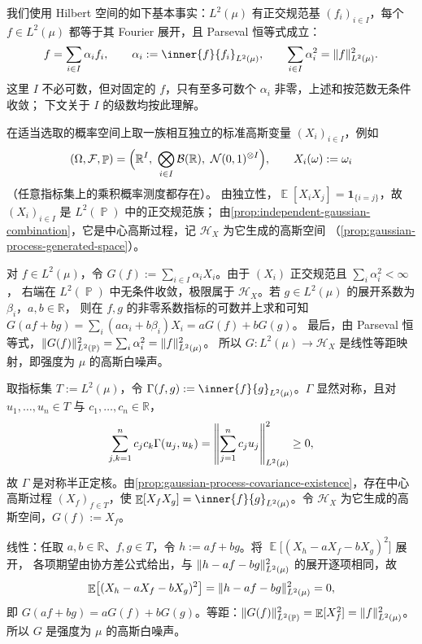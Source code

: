 \documentclass[UTF8,11pt,a4paper,oneside,fontset=fandol]{ctexrep}
\makeatletter
\numberwithin{equation}{section}
\theoremstyle{zhthm}
\renewenvironment{proof}[1][\proofname]{\par
  \pushQED{\qed}%
  \normalfont\topsep6\p@\@plus6\p@\relax
  \trivlist
  \item[\hskip\labelsep\bfseries#1\hspace{0.5em}]\ignorespaces
}{%
  \popQED\endtrivlist\@endpefalse
}
\renewcommand{\proofname}{证明}
\newcommand{\R}{\mathbb{R}}
\newcommand{\B}{\mathcal{B}}
\newcommand{\F}{\mathcal{F}}
\newcommand{\Hcal}{\mathcal{H}}
\DeclareMathOperator{\Prob}{\mathbb{P}}
\DeclareMathOperator{\E}{\mathbb{E}}
\newcommand{\Normal}{\mathcal{N}}
\newcommand{\ind}[1]{\mathbf{1}_{#1}}
\DeclarePairedDelimiter{\norm}{\lVert}{\rVert}
\makeatother
\begin{document}
\begin{proof}[证明{\mdseries（正交规范基构造）}]
我们使用 Hilbert 空间的如下基本事实\cite[\S1.4.3，练习 1.4.18、1.4.19 与命题 1.4.18，第 54--56 页]{Tao2010}：$L^2(\mu)$ 有正交规范基
$(f_i)_{i\in I}$，每个 $f\in L^2(\mu)$ 都等于其 Fourier 展开，且 Parseval 恒等式成立：
\[
  f=\sum_{i\in I}\alpha_if_i,\qquad \alpha_i:=\inner{f}{f_i}_{L^2(\mu)},\qquad
  \sum_{i\in I}\alpha_i^2=\norm{f}_{L^2(\mu)}^2.
\]
这里 $I$ 不必可数，但对固定的 $f$，只有至多可数个 $\alpha_i$ 非零，上述和按范数无条件收敛；
下文关于 $I$ 的级数均按此理解。

在适当选取的概率空间上取一族相互独立的标准高斯变量 $(X_i)_{i\in I}$，例如
\[
  (\Omega,\F,\Prob)=\Bigl(\R^I,\ \bigotimes_{i\in I}\B(\R),\ \Normal(0,1)^{\otimes I}\Bigr),
  \qquad X_i(\omega):=\omega_i
\]
（任意指标集上的乘积概率测度都存在\cite[定理 2.4.4 及例 2.4.8，第 240--241 页]{Tao2011}）。
由独立性，$\E[X_iX_j]=\ind{\{i=j\}}$，故 $(X_i)_{i\in I}$ 是 $L^2(\Prob)$ 中的正交规范族；
由\cref{prop:independent-gaussian-combination}，它是中心高斯过程，记 $\Hcal_X$ 为它生成的高斯空间
（\cref{prop:gaussian-process-generated-space}）。

对 $f\in L^2(\mu)$，令 $G(f):=\sum_{i\in I}\alpha_iX_i$。由于 $(X_i)$ 正交规范且 $\sum_i\alpha_i^2<\infty$，
右端在 $L^2(\Prob)$ 中无条件收敛，极限属于 $\Hcal_X$。若 $g\in L^2(\mu)$ 的展开系数为 $\beta_i$，$a,b\in\R$，
则在 $f,g$ 的非零系数指标的可数并上求和可知
$G(af+bg)=\sum_i(a\alpha_i+b\beta_i)X_i=aG(f)+bG(g)$。
最后，由 Parseval 恒等式，$\norm{G(f)}_{L^2(\Prob)}^2=\sum_i\alpha_i^2=\norm{f}_{L^2(\mu)}^2$。
所以 $G:L^2(\mu)\to\Hcal_X$ 是线性等距映射，即强度为 $\mu$ 的高斯白噪声。
\end{proof}

\begin{proof}[另证{\mdseries（协方差函数构造）}]
取指标集 $T:=L^2(\mu)$，令 $\Gamma(f,g):=\inner{f}{g}_{L^2(\mu)}$。$\Gamma$ 显然对称，且对 $u_1,\ldots,u_n\in T$ 与 $c_1,\ldots,c_n\in\R$，
\[
  \sum_{j,k=1}^{n}c_jc_k\Gamma(u_j,u_k)=\norm*{\sum_{j=1}^{n}c_ju_j}_{L^2(\mu)}^2\ge0,
\]
故 $\Gamma$ 是对称半正定核。由\cref{prop:gaussian-process-covariance-existence}，存在中心高斯过程
$(X_f)_{f\in T}$，使 $\E[X_fX_g]=\inner{f}{g}_{L^2(\mu)}$。令 $\Hcal_X$ 为它生成的高斯空间，$G(f):=X_f$。

线性：任取 $a,b\in\R$、$f,g\in T$，令 $h:=af+bg$。将 $\E\bigl[(X_h-aX_f-bX_g)^2\bigr]$ 展开，
各项期望由协方差公式给出，与 $\norm{h-af-bg}_{L^2(\mu)}^2$ 的展开逐项相同，故
\[
  \E\bigl[(X_h-aX_f-bX_g)^2\bigr]=\norm{h-af-bg}_{L^2(\mu)}^2=0,
\]
即 $G(af+bg)=aG(f)+bG(g)$。等距：$\norm{G(f)}_{L^2(\Prob)}^2=\E[X_f^2]=\norm{f}_{L^2(\mu)}^2$。
所以 $G$ 是强度为 $\mu$ 的高斯白噪声。
\end{proof}
\end{document}
